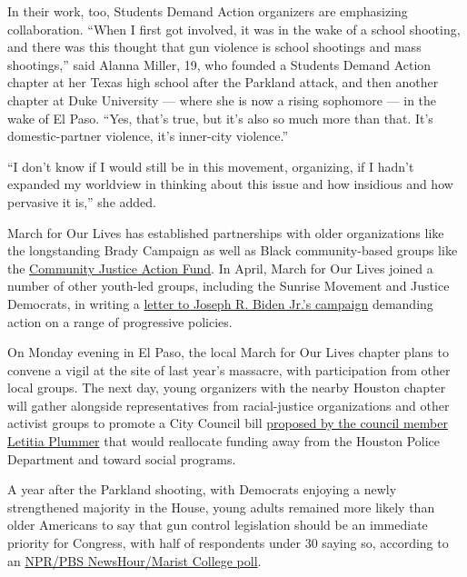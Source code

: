 In their work, too, Students Demand Action organizers are emphasizing
collaboration. ``When I first got involved, it was in the wake of a
school shooting, and there was this thought that gun violence is school
shootings and mass shootings,'' said Alanna Miller, 19, who founded a
Students Demand Action chapter at her Texas high school after the
Parkland attack, and then another chapter at Duke University --- where
she is now a rising sophomore --- in the wake of El Paso. ``Yes, that's
true, but it's also so much more than that. It's domestic-partner
violence, it's inner-city violence.''

``I don't know if I would still be in this movement, organizing, if I
hadn't expanded my worldview in thinking about this issue and how
insidious and how pervasive it is,'' she added.

March for Our Lives has established partnerships with older
organizations like the longstanding Brady Campaign as well as Black
community-based groups like the
\href{https://www.cjactionfund.org/}{Community Justice Action Fund}. In
April, March for Our Lives joined a number of other youth-led groups,
including the Sunrise Movement and Justice Democrats, in writing a
\href{https://marchforourlives.com/earn-our-vote/}{letter to Joseph R.
Biden Jr.'s campaign} demanding action on a range of progressive
policies.

On Monday evening in El Paso, the local March for Our Lives chapter
plans to convene a vigil at the site of last year's massacre, with
participation from other local groups. The next day, young organizers
with the nearby Houston chapter will gather alongside representatives
from racial-justice organizations and other activist groups to promote a
City Council bill
\href{https://www.khou.com/article/news/local/police-reform-proposal-involves-cutting-199-unfilled-hpd-positions/285-9a6b0853-7ce2-4638-aa35-65e0e12be3d8}{proposed
by the council member Letitia Plummer} that would reallocate funding
away from the Houston Police Department and toward social programs.

A year after the Parkland shooting, with Democrats enjoying a newly
strengthened majority in the House, young adults remained more likely
than older Americans to say that gun control legislation should be an
immediate priority for Congress, with half of respondents under 30
saying so, according to an
\href{http://maristpoll.marist.edu/wp-content/uploads/2019/02/NPR_PBS-NewsHour_Marist-Poll_USA-NOS-and-Tables_1902121446.pdf\#page=3}{NPR/PBS
NewsHour/Marist College poll}.

